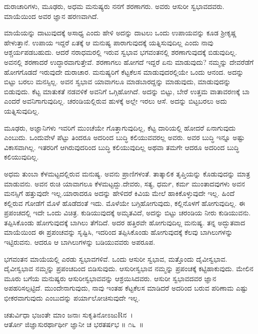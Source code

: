 \begin{artha}
ದುರಾಚಾರಿಗಳು, ಮೂಢರು, ಅಧಮ ಮನುಷ್ಯರು ನನಗೆ ಶರಣಾಗರು. ಅವರು ಆಸುರೀ ಸ್ವಭಾವದವರು. ಮಾಯೆಯಿಂದ ಅವರ ಜ್ಞಾನ ಹರಣವಾಗಿದೆ. 
\end{artha}

ಮಾಯೆಯನ್ನು ದಾಟುವುದಕ್ಕೆ ಅಸಾಧ್ಯ ಎಂದು ಹೇಳಿ ಅದನ್ನು ದಾಟಲು ಒಂದು ಉಪಾಯವನ್ನು ಕೂಡ ಶ‍್ರೀಕೃಷ್ಣ ಹೇಳುತ್ತಾನೆ. ಉಪಾಯ ಇದ್ದರೆ ಏತಕ್ಕೆ ಆ ಮನುಷ್ಯ ಪಾರಾಗುವುದಕ್ಕೆ ಯತ್ನಿಸುವುದಿಲ್ಲ ಎಂದು ನಾವು ಆಶ್ಚರ್ಯಪಡಬಹುದು. ಆದರೆ ನರಾಧಮರಲ್ಲಿ ಇರುವ ಸ್ವಭಾವ ಭಗವಂತನಲ್ಲಿ ಶರಣಾಗುವುದಕ್ಕೆ ಬಿಡುವುದಿಲ್ಲ. ಅವನಲ್ಲಿ ಶರಣಾದರೆ ಉದ್ಧಾರವಾಗುತ್ತೇವೆ. ಶರಣಾಗಲು ಹೋಗದೆ ಇದ್ದರೆ ಏನು ಮಾಡುವುದು? ನಮ್ಮನ್ನು ದೇವರೆಡೆಗೆ ಹೋಗಗೊಡದೆ ಇರುವುದೇ ದುರಾಚಾರ. ಮನುಷ್ಯರಿಗೆ ಕೆಟ್ಟಕೆಲಸ ಮಾಡುವುದರಲ್ಲಿಯೇ ಒಂದು ಆನಂದ. ಅದನ್ನು ಬಿಟ್ಟು ಬರಲು ಮನಸ್ಸಿಲ್ಲ. ಅವನ ಸ್ವಭಾವ ಯಾವಾಗಲೂ ಮಾಡಬಾರದ್ದನ್ನು ಮಾಡುವುದು, ಮಾಡುವುದನ್ನು ಬಿಡುವುದು. ಕೆಟ್ಟ ಮಾತುಕತೆ ನಡವಳಿಕೆ ಅವನಿಗೆ ಒಗ್ಗಿಹೋಗಿದೆ. ಅದನ್ನು ಬಿಟ್ಟು, ಬೇರೆ ಉತ್ತಮ ವಾತಾವರಣಕ್ಕೆ ಬಾ ಎಂದರೆ ಅವನಿಗಾಗುವುದಿಲ್ಲ. ಚರಂಡಿ\-ಯಲ್ಲಿರುವ ಹುಳಕ್ಕೆ ಅಲ್ಲೇ ಇರಲು ಆಸೆ. ಅದನ್ನು ಬಿಟ್ಟಬರಲು ಅದು ಯತ್ನಿಸುವುದಿಲ್ಲ. 

ಮೂಢರು, ಅಜ್ಞಾನಿಗಳು ಇವರಿಗೆ ಮುಂಚೆಯೇ ಗೊತ್ತಾಗುವುದಿಲ್ಲ, ಕೆಟ್ಟ ದಾರಿಯಲ್ಲಿ ಹೋದರೆ ಏನಾಗುವುದು ಎಂಬುದು. ಒಂದುವೇಳೆ ಪೆಟ್ಟು ತಿಂದರೂ ಅದರಿಂದ ಬುದ್ಧಿ ಕಲಿಯು\-ವವರಲ್ಲ ಅವರು. ಅವರ ಬುದ್ಧಿ ಇನ್ನೂ ಅಷ್ಟು ವಿಕಾಸವಾಗಿಲ್ಲ. ಇತರರಿಗೆ ಆಗಿರುವುದರಿಂದ ಬುದ್ಧಿ ಕಲಿಯುವುದಿಲ್ಲ ಅಥವಾ ತಮಗೇ ಆದರೂ ಅದರಿಂದ ಬುದ್ಧಿ ಕಲಿಯುವುದಿಲ್ಲ.

ಅಧಮ ತುಂಬಾ ಕೆಳಮಟ್ಟದಲ್ಲಿರುವ ಮನುಷ್ಯ. ಅವನು ಪ್ರಾಣಿಗಳಂತೆ. ತಾತ್ಕಾಲಿಕ ತೃಪ್ತಿಯನ್ನು ಕೊಡುವುದನ್ನು ಮಾತ್ರ ಮಾಡುವನು. ಅವನ ರುಚಿ ಯಾವಾಗಲೂ ಕೆಳಮಟ್ಟದ್ದು.\break ದೇವರು, ಸತ್ಯ, ಧರ್ಮ, ಕರ್ಮ ಮುಂತಾದವುಗಳು ಅವನ ಮನಸ್ಸಿಗೆ ಹತ್ತುವುದೇ ಇಲ್ಲ.\break ಯಾರಾದರೂ ಅದನ್ನು ಹೇಳಿದರೆ ಕಿವಿಯ ಮೇಲೆ ಹಾಕಿಕೊಳ್ಳುವುದೇ ಇಲ್ಲ. ಹಿಂದೆ ಕಲ್ಲಿರುವ ಗೋಡೆಗೆ ಮೊಳೆ ಹೊಡೆದಂತೆ ಇದು. ಮೊಳೆಯೇ ಬಗ್ಗಿಹೋಗುವುದು, ಕಲ್ಲಿನೊಳಗೆ ಹೋಗುವುದಿಲ್ಲ. ಈ ಪ್ರಪಂಚದಲ್ಲಿ ಇದೇ ಒಂದು ವಿಚಿತ್ರ. ಕುಡಿಯುವುದಕ್ಕೆ ಅಮೃತವಿದೆ, ಅದನ್ನು ಬಿಟ್ಟು ಚರಂಡಿಯ ನೀರು ಕುಡಿಯುವನು. ತಪ್ಪಿಸಿಕೊಂಡು ಹೋಗುವುದಕ್ಕೆ ಬಾಗಿಲು ತೆಗೆದಿದೆ. ಅದರ ಹತ್ತಿರವೇ ಹೋಗುವುದಿಲ್ಲ ಮನುಷ್ಯ. ತನ್ನ ಅದ್ಭುತವಾದ ಮಾಯೆಯಿಂದ ಈ ಪ್ರಪಂಚವನ್ನು ಸೃಷ್ಟಿಸಿ, ಇದರಿಂದ ತಪ್ಪಿಸಿಕೊಂಡು ಹೋಗುವುದಕ್ಕೆ ಕೆಲವು ಬಾಗಿಲುಗಳನ್ನು ಇಟ್ಟಿರುವನು. ಆದರೂ ಆ ಬಾಗಿಲುಗಳನ್ನು ಬಡಿಯುವವರು ಅಪರೂಪ. 

ಭಗವಂತನ ಮಾಯೆಯಲ್ಲಿ ಎರಡು ಸ್ವಭಾವಗಳಿವೆ. ಒಂದು ಆಸುರೀ ಸ್ವಭಾವ, ಮತ್ತೊಂದು ದೈವೀಸ್ವಭಾವ. ದೈವೀಸ್ವಭಾವ ನಮ್ಮನ್ನು ಪ್ರಪಂಚದಿಂದ ಬಿಡಿಸುವುದು. ಆಸುರೀಸ್ವಭಾವ ನಮ್ಮನ್ನು ಪ್ರಪಂಚಕ್ಕೆ ಕಟ್ಟಿಹಾಕುವುದು. ಮೇಲಿನ ಮೂರು ಬಗೆಯ ಮನುಷ್ಯರು ಆಸುರೀಸ್ವಭಾವವನ್ನು ಆಶ್ರಯಿಸಿದವರು. ಆಸುರೀ ಸ್ವಭಾವದವರ ಜ್ಞಾನ ಅಪಹರಿಸಲ್ಪಟ್ಟಿದೆ. ಮುಂದೇನಾಗುವುದು, ನಾವು ಇಂತಹ ಕೆಟ್ಟಕೆಲಸ ಮಾಡಿದರೆ ಅದರಿಂದ ಬರುವ ಪರಿಣಾಮ ಎಷ್ಟು ಭೀಕರವಾಗುವುದು ಎಂಬುದನ್ನು ಪರ್ಯಾಲೋಚಿಸುವುದೇ ಇಲ್ಲ.

\begin{shloka}
ಚತುರ್ವಿಧಾ ಭಜಂತೇ ಮಾಂ ಜನಾಃ ಸುಕೃತಿನೋಽಜುRನ~।\\ಆರ್ತೋ ಜಿಜ್ಞಾಸುರರ್ಥಾರ್ಥೀ ಜ್ಞಾನೀ ಚ ಭರತರ್ಷಭ \hfill॥ ೧೬~॥
\end{shloka}

